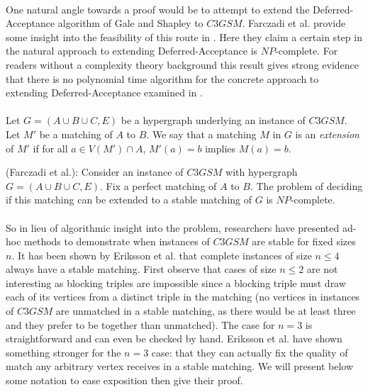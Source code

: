 \paragraph{}
One natural angle towards a proof would be to attempt to extend the Deferred-Acceptance algorithm of Gale and Shapley to $C3GSM$. Farczadi et al. provide some insight into the feasibility of this route in \cite{farczadi2014stable}. Here they claim a certain step in the natural approach to extending Deferred-Acceptance is $NP$-complete. For readers without a complexity theory background this result gives strong evidence that there is no polynomial time algorithm for the concrete approach to extending Deferred-Acceptance examined in \cite{farczadi2014stable}.

\paragraph{}Let $G = (A\cup B \cup C, E)$ be a hypergraph underlying an instance of $C3GSM$. Let $M'$ be a matching of $A$ to $B$. We say that a matching $M$ in $G$ is an {\it extension} of $M'$ if for all $a \in V(M') \cap A$, $M'(a) = b$ implies $M(a) = b$.

\begin{theorem}
(Farczadi et al.): Consider an instance of $C3GSM$ with hypergraph $G=(A\cup B\cup C, E)$. Fix a perfect matching of $A$ to $B$. The problem of deciding if this matching can be extended to a stable matching of $G$ is $NP$-complete.
\end{theorem}
\paragraph{}
So in lieu of algorithmic insight into the problem, researchers have presented ad-hoc methods to demonstrate when instances of $C3GSM$ are stable for fixed sizes $n$. It has been shown by Eriksson et al. \cite{eriksson2006three} that complete instances of size $n \leq 4$ always have a stable matching. First observe that cases of size $n \leq 2$ are not interesting as blocking triples are impossible since a blocking triple must draw each of its vertices from a distinct triple in the matching (no vertices in instances of $C3GSM$ are unmatched in a stable matching, as there would be at least three and they prefer to be together than unmatched). The case for $n=3$ is straightforward and can even be checked by hand. Eriksson et al. have shown something stronger for the $n=3$ case: that they can actually fix the quality of match any arbitrary vertex receives in a stable matching. We will present below some notation to ease exposition then give their proof.

